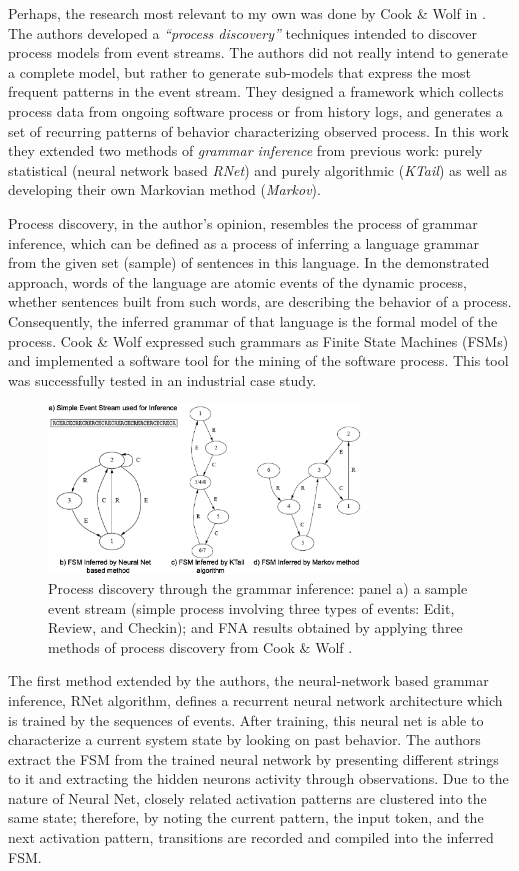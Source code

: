 \documentclass{sig-alternate}
\begin{document}
Perhaps, the research most relevant to my own was done by Cook \& Wolf in \cite{citeulike:328044}. The authors developed a \textit{``process discovery''} techniques intended to discover process models from event streams. The authors did not really intend to generate a complete model, but rather to generate sub-models that express the most frequent patterns in the event stream. They designed a framework which collects process data from ongoing software process or from history logs, and generates a set of recurring patterns of behavior characterizing observed process. In this work they extended two methods of \textit{grammar inference} from previous work: purely statistical (neural network based \textit{RNet}) and purely algorithmic (\textit{KTail}) as well as developing their own Markovian method (\textit{Markov}). 

Process discovery, in the author's opinion, resembles the process of grammar inference, which can be defined as a process of inferring a language grammar from the given set (sample) of sentences in this language. In the demonstrated approach, words of the language are atomic events of the dynamic process, whether sentences built from such words, are describing the behavior of a process. Consequently, the inferred grammar of that language is the formal model of the process. Cook \& Wolf expressed such grammars as Finite State Machines (FSMs) and implemented a software tool for the mining of the software process. This tool was successfully tested in an industrial case study.

\begin{figure}[tbp]
   \centering
   \includegraphics[height=45mm]{inference.eps}
   \caption{Process discovery through the grammar inference: panel a) a sample event stream (simple process involving three types of events: Edit, Review, and Checkin); and FNA results obtained by applying three methods of process discovery from Cook \& Wolf \cite{citeulike:328044}.}
   \label{fig:inference}
\end{figure}

The first method extended by the authors, the neural-network based grammar inference, RNet algorithm, defines a recurrent neural network architecture which is trained by the sequences of events. After training, this neural net is able to characterize a current system state by looking on past behavior. The authors extract the FSM from the trained neural network by presenting different strings to it and extracting the hidden neurons activity through observations. Due to the nature of Neural Net, closely related activation patterns are clustered into the same state; therefore, by noting the current pattern, the input token, and the next activation pattern, transitions are recorded and compiled into the inferred FSM.
\end{document}
